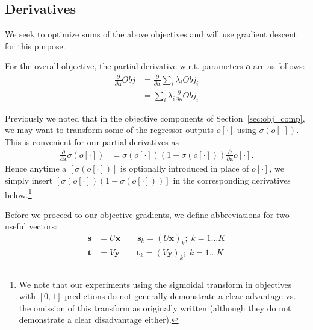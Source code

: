 \documentclass{sig-alternate}
\renewcommand{\a}{\vec{a}}
\newcommand{\x}{\vec{x}}
\newcommand{\y}{\vec{y}}
\newcommand{\s}{\vec{s}}
\renewcommand{\t}{\vec{t}}
\renewcommand{\vec}[1]{\mathbf{#1}}
\begin{document}
\subsection{Derivatives}

\label{sec:obj_grad}

We seek to optimize sums of the above objectives and will use
gradient descent for this purpose.  

For the overall objective, the partial derivative 
w.r.t. parameters $\a$ are as follows:
\begin{align*}
\frac{\partial}{\partial \a} \mathit{Obj} & = \frac{\partial}{\partial \a} \sum_i \lambda_i \mathit{Obj}_i\\
& = \sum_i \lambda_i \frac{\partial}{\partial \a} \mathit{Obj}_i \label{eq:sum_der}
\end{align*}

Previously we noted that in the
objective components of Section~\ref{sec:obj_comp}, we may want to transform
some of the regressor outputs $o[\cdot]$ using $\sigma(o[\cdot])$.  
This is convenient for our partial derivatives as
\begin{align}
 \frac{\partial}{\partial \a}\sigma(o[\cdot]) & = \sigma(o[\cdot]) (1 - \sigma(o[\cdot])) \frac{\partial}{\partial \a} o[\cdot] .
\end{align}
Hence anytime a $[\sigma(o[\cdot])]$ is optionally 
introduced in place of $o[\cdot]$, we simply
insert $[\sigma(o[\cdot]) (1 - \sigma(o[\cdot]))]$ in the corresponding derivatives 
below.\footnote{We note that our experiments using the sigmoidal transform in
objectives with $[0,1]$ predictions do not generally demonstrate a
clear advantage vs. the omission of this transform as originally
written (although they do not demonstrate a clear disadvantage
either).}

Before we proceed to our objective gradients, we define abbreviations
for two useful vectors:
\begin{align*}
\s & = U \x \qquad \s_{k} = (U \x)_{k}; \; k=1\ldots K\\
\t & = V \y \qquad \t_{k} = (V \y)_{k}; \; k=1\ldots K
\end{align*}
\end{document}

